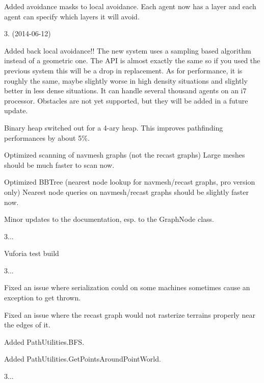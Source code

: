 \begin{DoxyItemize}
\begin{DoxyItemize}
\item Added avoidance masks to local avoidance. Each agent now has a layer and each agent can specify which layers it will avoid.
\end{DoxyItemize}
\item 3. (2014-\/06-\/12)
\begin{DoxyItemize}
\item Added back local avoidance!! The new system uses a sampling based algorithm instead of a geometric one. The A\+PI is almost exactly the same so if you used the previous system this will be a drop in replacement. As for performance, it is roughly the same, maybe slightly worse in high density situations and slightly better in less dense situations. It can handle several thousand agents on an i7 processor. Obstacles are not yet supported, but they will be added in a future update.
\item Binary heap switched out for a 4-\/ary heap. This improves pathfinding performances by about 5\%.
\item Optimized scanning of navmesh graphs (not the recast graphs) Large meshes should be much faster to scan now.
\item Optimized B\+B\+Tree (nearest node lookup for navmesh/recast graphs, pro version only) Nearest node queries on navmesh/recast graphs should be slightly faster now.
\item Minor updates to the documentation, esp. to the Graph\+Node class.
\end{DoxyItemize}
\item 3...
\begin{DoxyItemize}
\item Vuforia test build
\end{DoxyItemize}
\item 3...
\begin{DoxyItemize}
\item Fixed an issue where serialization could on some machines sometimes cause an exception to get thrown.
\item Fixed an issue where the recast graph would not rasterize terrains properly near the edges of it.
\item Added Path\+Utilities.\+B\+FS.
\item Added Path\+Utilities.\+Get\+Points\+Around\+Point\+World.
\end{DoxyItemize}
\item 3...
\begin{DoxyItemize}

\end{DoxyItemize}
\end{DoxyItemize}
